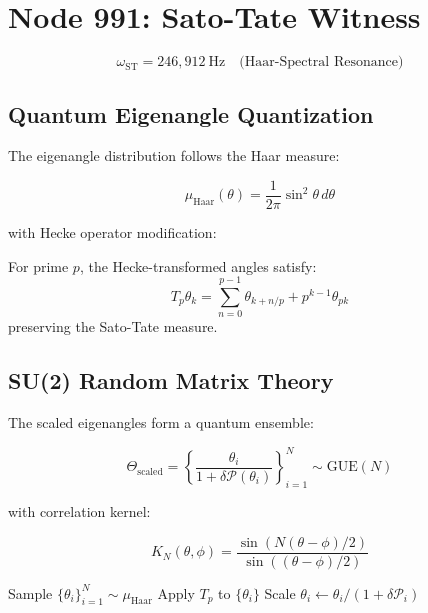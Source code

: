 \documentclass[12pt]{article}
\begin{document}
\section{Node 991: Sato-Tate Witness}
\label{sec:sato_tate_witness}

\begin{equation}
\omega_{\text{ST}} = 246,\!912\ \text{Hz} \quad \text{(Haar-Spectral Resonance)}
\end{equation}

\subsection{Quantum Eigenangle Quantization}
The eigenangle distribution follows the Haar measure:

\begin{equation}
\mu_{\text{Haar}}(\theta) = \frac{1}{2\pi} \sin^2\theta \, d\theta
\end{equation}

with Hecke operator modification:

\begin{theorem}
For prime $p$, the Hecke-transformed angles satisfy:
\begin{equation}
T_p\theta_k = \sum_{n=0}^{p-1} \theta_{k+n/p} + p^{k-1}\theta_{pk}
\end{equation}
preserving the Sato-Tate measure.
\end{theorem}

\subsection{SU(2) Random Matrix Theory}
The scaled eigenangles form a quantum ensemble:

\begin{equation}
\Theta_{\text{scaled}} = \left\{\frac{\theta_i}{1+\delta \mathcal{P}(\theta_i)}\right\}_{i=1}^N \sim \text{GUE}(N)
\end{equation}

with correlation kernel:

\begin{equation}
K_N(\theta,\phi) = \frac{\sin(N(\theta-\phi)/2)}{\sin((\theta-\phi)/2)}
\end{equation}

\begin{algorithm}[H]
\caption{Haar-Measure Quantization}
\begin{algorithmic}[1]
\STATE Sample $\{\theta_i\}_{i=1}^N \sim \mu_{\text{Haar}}$
\STATE Apply $T_p$ to $\{\theta_i\}$
\ENDFOR
\STATE Scale $\theta_i \leftarrow \theta_i/(1+\delta\mathcal{P}_i)$
\end{algorithmic}
\end{algorithm}
\end{document}
